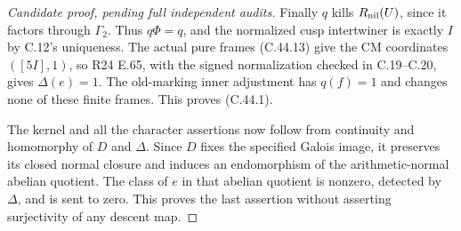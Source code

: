 \begin{proof}[Candidate proof, pending full independent audits]
Finally $q$ kills $R_{\rm nil}(U)$, since it factors through
$\Gamma_2$. Thus $q\Phi=q$, and the normalized cusp intertwiner
is exactly $I$ by C.12's uniqueness. The actual pure frames
(C.44.13) give the CM coordinates $([5I],1)$, so R24 E.65,
with the signed normalization checked in C.19--C.20, gives
$\Delta(e)=1$. The old-marking inner adjustment has $q(f)=1$
and changes none of these finite frames. This proves (C.44.1).

The kernel and all the character assertions now follow from
continuity and homomorphy of $D$ and $\Delta$. Since $D$ fixes
the specified Galois image, it preserves its closed normal
closure and induces an endomorphism of the arithmetic-normal
abelian quotient. The class of $e$ in that abelian quotient is
nonzero, detected by $\Delta$, and is sent to zero. This proves
the last assertion without asserting surjectivity of any descent map.
\end{proof}
